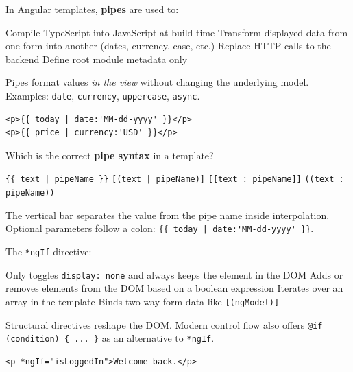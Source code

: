 \question[4]
In Angular templates, \textbf{pipes} are used to:
\begin{choices}
  \choice Compile TypeScript into JavaScript at build time
  \CorrectChoice Transform displayed data from one form into another (dates, currency, case, etc.)
  \choice Replace HTTP calls to the backend
  \choice Define root module metadata only
\end{choices}
\begin{solution}
  Pipes format values \emph{in the view} without changing the underlying model. Examples: \lstinline[style=htmlinline]|date|, \lstinline[style=htmlinline]|currency|, \lstinline[style=htmlinline]|uppercase|, \lstinline[style=htmlinline]|async|.
\begin{lstlisting}[style=htmlinline]
<p>{{ today | date:'MM-dd-yyyy' }}</p>
<p>{{ price | currency:'USD' }}</p>
\end{lstlisting}
\end{solution}



\newpage



\question[4]
Which is the correct \textbf{pipe syntax} in a template?
\begin{choices}
  \CorrectChoice \lstinline[style=htmlinline]!{{ text | pipeName }}!
  \choice \lstinline[style=htmlinline]![(text | pipeName)]!
  \choice \lstinline[style=htmlinline]|[[text : pipeName]]|
  \choice \lstinline[style=htmlinline]|((text : pipeName))|
\end{choices}
\begin{solution}
  The vertical bar separates the value from the pipe name inside interpolation. Optional parameters follow a colon: \lstinline[style=htmlinline]!{{ today | date:'MM-dd-yyyy' }}!.
\end{solution}


\question[4]
The \lstinline[style=htmlinline]|*ngIf| directive:
\begin{choices}
  \choice Only toggles \lstinline[style=cssinline]|display: none| and always keeps the element in the DOM
  \CorrectChoice Adds or removes elements from the DOM based on a boolean expression
  \choice Iterates over an array in the template
  \choice Binds two-way form data like \lstinline[style=htmlinline]|[(ngModel)]|
\end{choices}
\begin{solution}
  Structural directives reshape the DOM. Modern control flow also offers \lstinline[style=htmlinline]|@if (condition) { ... }| as an alternative to \lstinline[style=htmlinline]|*ngIf|.
\begin{lstlisting}[style=htmlinline]
<p *ngIf="isLoggedIn">Welcome back.</p>
\end{lstlisting}
\end{solution}

